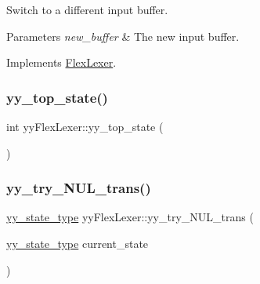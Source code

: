 Switch to a different input buffer. 
\begin{DoxyParams}{Parameters}
{\em new\+\_\+buffer} & The new input buffer. \\
\hline
\end{DoxyParams}


Implements \hyperlink{classFlexLexer_a3fa4649c1866a483fc391923ca90ca1d}{Flex\+Lexer}.

\mbox{\label{classyyFlexLexer_aa1ae2fa3798a4d520bc846052207f562}} 
\subsubsection{\texorpdfstring{yy\+\_\+top\+\_\+state()}{yy\_top\_state()}}
{\footnotesize\ttfamily int yy\+Flex\+Lexer\+::yy\+\_\+top\+\_\+state (\begin{DoxyParamCaption}{ }\end{DoxyParamCaption})\hspace{0.3cm}{\ttfamily [protected]}}

\mbox{\label{classyyFlexLexer_ac58babd5c2cb9b7ba0b08cbc0898c89f}} 
\subsubsection{\texorpdfstring{yy\+\_\+try\+\_\+\+N\+U\+L\+\_\+trans()}{yy\_try\_NUL\_trans()}}
{\footnotesize\ttfamily \hyperlink{FlexLexer_8h_a9ba7c416f135b0f0c1f4addded4616b5}{yy\+\_\+state\+\_\+type} yy\+Flex\+Lexer\+::yy\+\_\+try\+\_\+\+N\+U\+L\+\_\+trans (\begin{DoxyParamCaption}\item[{\hyperlink{FlexLexer_8h_a9ba7c416f135b0f0c1f4addded4616b5}{yy\+\_\+state\+\_\+type}}]{current\+\_\+state }\end{DoxyParamCaption})\hspace{0.3cm}{\ttfamily [protected]}}

\mbox{\label{classyyFlexLexer_a12af5c2b352914fabe55dfa8b1a77a15}} 
